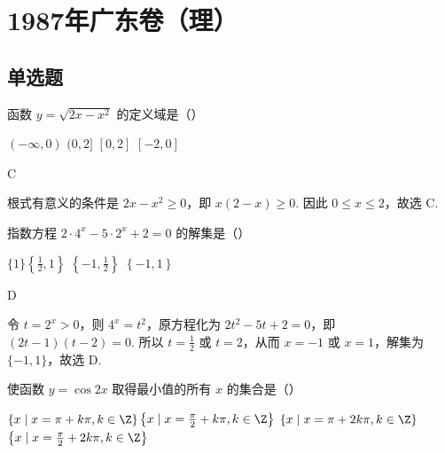 \chapter{1987年广东卷（理）}

\section{单选题}

\begin{problem}

函数 \(y = \sqrt{2x - x^2} \) 的定义域是（\quad）

\choices
{\((- \infty, 0) \)}
{\((0, 2] \)}
{\([0, 2] \)}
{\([-2, 0] \)}
\end{problem}

\begin{answer}
C
\end{answer}

\begin{solution}
根式有意义的条件是 \(2x-x^{2}\geqslant0\)，即 \(x(2-x)\geqslant0\). 因此 \(0\leqslant x\leqslant2\)，故选 C.
\end{solution}

\begin{problem}

指数方程 \(2\cdot 4^{x} - 5\cdot 2^{x} + 2 = 0 \) 的解集是（\quad）

\choices
{\(\{1\} \)}{\(\left\{ \frac{1}{2}, 1 \right\} \)}
{\(\left\{ -1, \frac{1}
{2} \right\} \)}
{\(\left\{ -1, 1 \right\} \)}
\end{problem}

\begin{answer}
D
\end{answer}

\begin{solution}
令 \(t=2^{x}>0\)，则 \(4^{x}=t^{2}\)，原方程化为 \(2t^{2}-5t+2=0\)，即 \((2t-1)(t-2)=0\). 所以 \(t=\frac{1}{2}\) 或 \(t=2\)，从而 \(x=-1\) 或 \(x=1\)，解集为 \(\{-1,1\}\)，故选 D.
\end{solution}

\begin{problem}

使函数 \(y = \cos 2x \) 取得最小值的所有 \(x \) 的集合是（\quad）

\choices
{\(\{x \mid x = \pi + k\pi, k \in \Z\} \)}{\(\left\{x \mid x = \frac{\pi}{2} + k\pi, k \in \Z\right\} \)}
{\(\{x \mid x = \pi + 2k\pi, k \in \Z\} \)}
{\(\left\{x \mid x = \frac{\pi}
{2} + 2k\pi, k \in \Z\right\} \)}
\end{problem}

